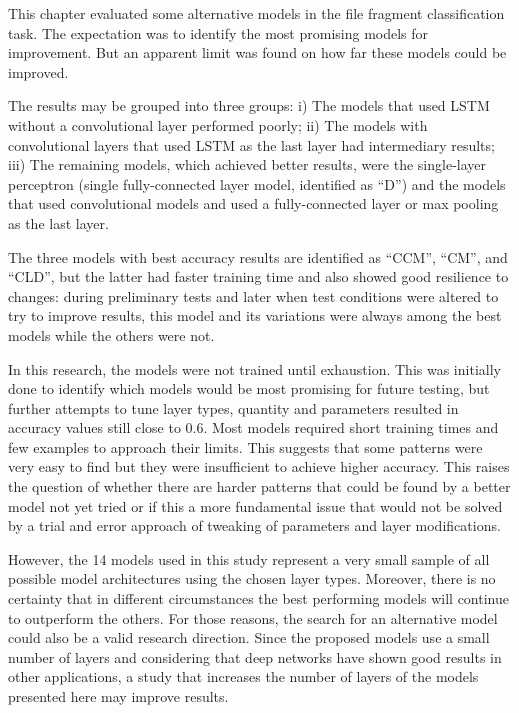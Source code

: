 This chapter evaluated some alternative models in the file fragment classification task. The expectation was to identify the most promising models for improvement. But an apparent limit was found on how far these models could be improved.

The results may be grouped into three groups: i) The models that used LSTM without a convolutional layer performed poorly; ii) The models with convolutional layers that used LSTM as the last layer had intermediary results; iii) The remaining models, which achieved better results, were the single-layer perceptron (single fully-connected layer model, identified as ``D'') and the models that used convolutional models and used a fully-connected layer or max pooling as the last layer.

The three models with best accuracy results are identified as ``CCM'', ``CM'', and ``CLD'', but the latter had faster training time and also showed good resilience to changes: during preliminary tests and later when test conditions were altered to try to improve results, this model and its variations were always among the best models while the others were not.

In this research, the models were not trained until exhaustion.
This was initially done to identify which models would be most promising for future testing, but further attempts to tune layer types, quantity and parameters resulted in accuracy values still close to 0.6.
Most models required short training times and few examples to approach their limits.
This suggests that some patterns were very easy to find but they were insufficient to achieve higher accuracy.
This raises the question of whether there are harder patterns that could be found by a better model not yet tried or if this a more fundamental issue that would not be solved by a trial and error approach of tweaking of parameters and layer modifications.


However, the 14 models used in this study represent a very small sample of all possible model architectures using the chosen layer types. Moreover, there is no certainty that in different circumstances the best performing models will continue to outperform the others. For those reasons, the search for an alternative model could also be a valid research direction. Since the proposed models use a small number of layers and considering that deep networks have shown good results in other applications, a study that increases the number of layers of the models presented here may improve results.

